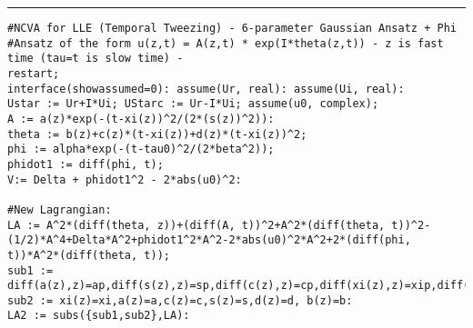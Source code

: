 \vskip18pt\hrule\vskip-10pt\hskip0pt
\begin{lstlisting}
#NCVA for LLE (Temporal Tweezing) - 6-parameter Gaussian Ansatz + Phi
#Ansatz of the form u(z,t) = A(z,t) * exp(I*theta(z,t)) - z is fast time (tau=t is slow time) - 
restart; 
interface(showassumed=0): assume(Ur, real): assume(Ui, real): 
Ustar := Ur+I*Ui; UStarc := Ur-I*Ui; assume(u0, complex);
A := a(z)*exp(-(t-xi(z))^2/(2*(s(z))^2)):   
theta := b(z)+c(z)*(t-xi(z))+d(z)*(t-xi(z))^2;
phi := alpha*exp(-(t-tau0)^2/(2*beta^2));
phidot1 := diff(phi, t);
V:= Delta + phidot1^2 - 2*abs(u0)^2:

#New Lagrangian:
LA := A^2*(diff(theta, z))+(diff(A, t))^2+A^2*(diff(theta, t))^2-(1/2)*A^4+Delta*A^2+phidot1^2*A^2-2*abs(u0)^2*A^2+2*(diff(phi, t))*A^2*(diff(theta, t));
sub1 := diff(a(z),z)=ap,diff(s(z),z)=sp,diff(c(z),z)=cp,diff(xi(z),z)=xip,diff(d(z),z)=dp,diff(b(z),z)=bp:
sub2 := xi(z)=xi,a(z)=a,c(z)=c,s(z)=s,d(z)=d, b(z)=b:
LA2 := subs({sub1,sub2},LA):


\end{lstlisting}
